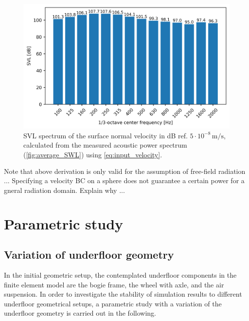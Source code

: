 {\begin{figure}
	\centering
	\includegraphics{fig/chap4/input_SVL.png}
	\caption{SVL spectrum of the surface normal velocity in dB ref. $5\cdot10^{-8}\,\text{m/s}$, calculated from the measured acoustic power spectrum (\cref{fig:average_SWL}) using \cref{eq:input_velocity}.}
	\label{fig:input_SVL}
\end{figure}

Note that above derivation is only valid for the assumption of free-field radiation ... Specifying a velocity BC on a sphere does not guarantee a certain power for a gneral radiation domain. Explain why ...

\newpage
\section{Parametric study}
\label{section:parametric_study}
\subsection{Variation of underfloor geometry}
\label{section:variation_geometry}

In the initial geometric setup, the contemplated underfloor components in the finite element model are the bogie frame, the wheel with axle, and the air suspension. In order to investigate the stability of simulation results to different underfloor geometrical setups, a parametric study with a variation of the underfloor geometry is carried out in the following.

}
